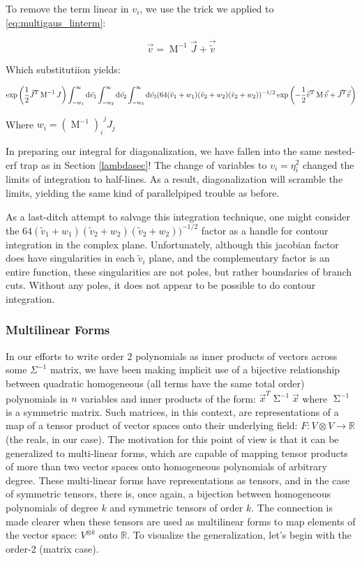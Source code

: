 \documentclass[10pt,letterpaper]{article}
\def\d{{\rm d}}  %
\begin{document}
To remove the term linear in $v_i$, we use the trick we applied to \ref{eq:multigaus_linterm}:

$$\vec{v} = \operatorname{M}^{-1} \vec{J} + \vec{\tilde{v}}$$

Which substitutiion yields:

\begin{equation} 
\exp\left(\frac{1}{2}\vec{J}^T \operatorname{M}^{-1} J\right) \int_{-w_1}^{\infty} \d \tilde{v_1} \int_{-w_2}^{\infty} \d \tilde{v_2} \int_{-w_3}^{\infty} \d \tilde{v_3}  (64 (\tilde{v}_1 + w_1)(\tilde{v}_2 + w_2)(\tilde{v}_2 + w_2))^{-1/2}  \exp\left(-\frac{1}{2} \vec{\tilde{v}}^T \operatorname{M} \vec{\tilde{v}} + \vec{J}^T \vec{\tilde{v}}\right)
\end{equation}

Where $w_i = {(\operatorname{M}^{-1})_i}^j J_j$

In preparing our integral for diagonalization, we have fallen into the same nested-erf trap as in Section \ref{lambdasec}! The change of variables to $v_i = \eta_i^2$ changed the limits of integration to half-lines. As a result, diagonalization will scramble the limits, yielding the same kind of parallelpiped trouble as before.

As a last-ditch attempt to salvage this integration technique, one might consider the $64 (\tilde{v}_1 + w_1)(\tilde{v}_2 + w_2)(\tilde{v}_2 + w_2))^{-1/2}$ factor as a handle for contour integration in the complex plane. Unfortunately, although this jacobian factor does have singularities in each $\tilde{v}_i$ plane, and the complementary factor is an entire function, these singularities are not poles, but rather boundaries of branch cuts. Without any poles, it does not appear to be possible to do contour integration.

\subsubsection{Multilinear Forms}

In our efforts to write order 2 polynomials as inner products of vectors across some $\Sigma^{-1}$ matrix, we have been making implicit use of a bijective relationship between quadratic homogeneous (all terms have the same total order) polynomials in $n$ variables and inner products of the form: $\vec{x}^T \operatorname{\Sigma}^{-1} \vec{x}$ where $\operatorname{\Sigma}^{-1}$ is a symmetric matrix. Such matrices, in this context, are representations of a map of a tensor product of vector spaces onto their underlying field: $F: V \otimes V \rightarrow \mathbb{R}$ (the reals, in our case). The motivation for this point of view is that it can be generalized to multi-linear forms, which are capable of mapping tensor products of more than two vector spaces onto homogeneous polynomials of arbitrary degree. These multi-linear forms have representations as tensors, and in the case of symmetric tensors, there is, once again, a bijection between homogeneous polynomials of degree $k$ and symmetric tensors of order $k$. The connection is made clearer when these tensors are used as multilinear forms to map elements of the vector space: $V^{\otimes k}$ onto $\mathbb{R}$. To visualize the generalization, let's begin with the order-2 (matrix case).
\end{document}
